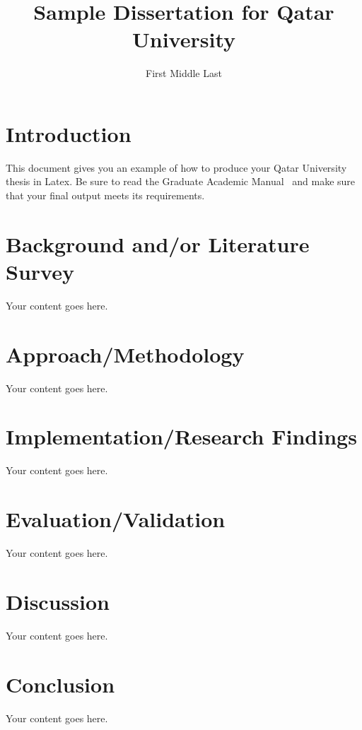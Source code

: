 \documentclass[12pt,lot,lof]{quthesis}
\title{Sample Dissertation for Qatar University}
\author{First Middle Last} %
\begin{document}
\makefrontmatter

\chapter{Introduction}
This document gives you an example of how to produce your Qatar 
University thesis in Latex.  Be sure to read the 
Graduate Academic Manual~\cite{qugam} and make sure that your
final output meets its requirements.

\chapter{Background and/or Literature Survey}
Your content goes here.

\chapter{Approach/Methodology}
Your content goes here.

\chapter{Implementation/Research Findings}
Your content goes here.

\chapter{Evaluation/Validation}
Your content goes here.

\chapter{Discussion}
Your content goes here.

\chapter{Conclusion}
Your content goes here.

\singlespacing


\cleardoublepage
\ifdefined{}
\else
\fi
{}




\end{document}
